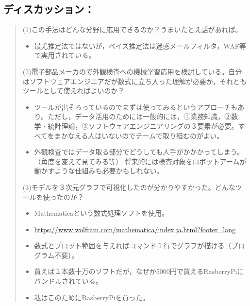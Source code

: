 \documentclass[letterpaper,10pt,dvipdfmx]{sphinxmanual}
\begin{document}
\subsection{ディスカッション：}
\label{minute-05-20160824:id8}\begin{quote}

(1)この手法はどんな分野に応用できるのか？うまいたとえ話があれば。
\begin{itemize}
\item {} 
最尤推定法ではないが，ベイズ推定法は迷惑メールフィルタ，WAF等で実用されている。

\end{itemize}

(2)電子部品メーカので外観検査への機械学習応用を検討している。自分はソフトウェアエンジニアだが数式に立ち入った理解が必要か，それともツールとして使えればよいのか？
\begin{itemize}
\item {} 
ツールが出そろっているのでまずは使ってみるというアプローチもあり。ただし，データ活用のためには一般的には，①業務知識，②数学・統計理論，③ソフトウェアエンジニアリングの３要素が必要。すべてをまかなえる人はいないのでチームで取り組むのがよい。

\item {} 
外観検査ではデータ取る部分でどうしても人手がかかかってしまう。（角度を変えて見てみる等） 将来的には検査対象をロボットアームが動かすような仕組みも必要かもしれない。

\end{itemize}

(3)モデルを３次元グラフで可視化したのが分かりやすかった。どんなツールを使ったのか？
\begin{itemize}
\item {} 
Mathematicaという数式処理ソフトを使用。

\item {} 
\url{https://www.wolfram.com/mathematica/index.ja.html?footer=lang}

\item {} 
数式とプロット範囲を与えればコマンド１行でグラフが描ける（プログラム不要）。

\item {} 
買えば１本数十万のソフトだが，なぜか5000円で買えるRasberryPiにバンドルされている。

\item {} 
私はこのためにRasberryPiを買った。

\end{itemize}
\end{quote}
\end{document}
